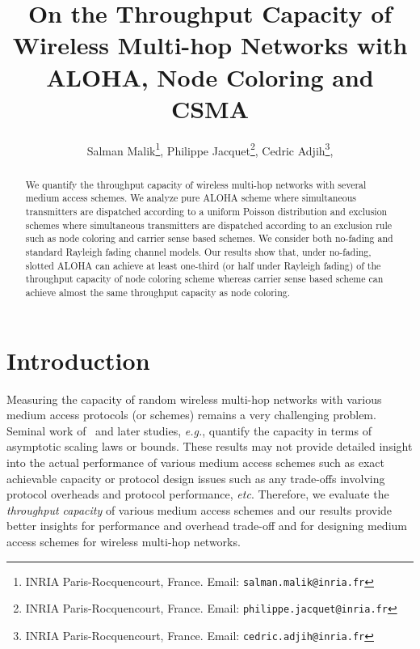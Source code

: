 \documentclass[12pt,english]{article}
\begin{document}
\title{On the Throughput Capacity of Wireless Multi-hop Networks with ALOHA, Node Coloring and CSMA}

\author{
Salman Malik\footnote{INRIA Paris-Rocquencourt, France. Email: \texttt{salman.malik@inria.fr}}, 
Philippe Jacquet\footnote{INRIA Paris-Rocquencourt, France. Email: \texttt{philippe.jacquet@inria.fr}},
Cedric Adjih\footnote{INRIA Paris-Rocquencourt, France. Email: \texttt{cedric.adjih@inria.fr}},
}
\date{}

\maketitle

\begin{abstract}

We quantify the throughput capacity of wireless multi-hop networks with several medium access schemes. We analyze pure ALOHA scheme where simultaneous transmitters are dispatched according to a uniform Poisson distribution and exclusion schemes where simultaneous transmitters are dispatched according to an exclusion rule such as node coloring and carrier sense based schemes. We consider both no-fading and standard Rayleigh fading channel models. Our results show that, under no-fading, slotted ALOHA can achieve at least one-third (or half under Rayleigh fading) of the throughput capacity of node coloring scheme whereas carrier sense based scheme can achieve almost the same throughput capacity as node coloring.  

\end{abstract}

\section{Introduction}
\label{sec:intro}

Measuring the capacity of random wireless multi-hop networks with various medium access protocols (or schemes) remains a very challenging problem. Seminal work of~\cite{Gupta:Kumar} and later studies, {\it e.g.}, \cite{scaling,scaling2} quantify the capacity in terms of asymptotic scaling laws or bounds. These results may not provide detailed insight into the actual performance of various medium access schemes such as exact achievable capacity or protocol design issues such as any trade-offs involving protocol overheads and protocol performance, {\it etc}. Therefore, we evaluate the {\em throughput capacity} of various medium access schemes and our results provide better insights for performance and overhead trade-off and for designing medium access schemes for wireless multi-hop networks.
\end{document}
